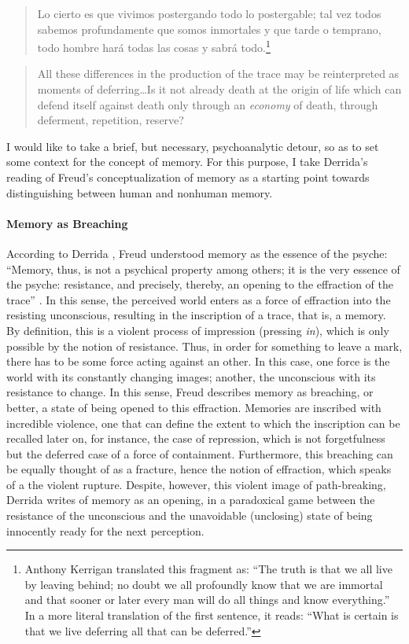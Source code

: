 \begin{quote}
	Lo cierto es que vivimos postergando todo lo postergable; tal vez todos sabemos profundamente que somos inmortales y que tarde o temprano, todo hombre hará todas las cosas y sabrá todo.\footnote{Anthony Kerrigan translated this fragment as: ``The truth is that we all live by leaving behind; no doubt we all profoundly know that we are immortal and that sooner or later every man will do all things and know everything.'' In a more literal translation of the first sentence, it reads: ``What is certain is that we live deferring all that can be deferred.''} \parencite{Bor42:Fun}
\end{quote}
\begin{quote}
	All these differences in the production of the trace may be reinterpreted as moments of deferring\dots Is it not already death at the origin of life which can defend itself against death only through an \textit{economy} of death, through deferment, repetition, reserve? \parencite[202]{Der78:Wri}
\end{quote}

I would like to take a brief, but necessary, psychoanalytic detour, so as to set some context for the concept of memory. For this purpose, I take Derrida's reading of Freud's conceptualization of memory as a starting point towards distinguishing between human and nonhuman memory. 

\paragraph{Memory as Breaching}
According to Derrida \parencite{Der78:Wri}, Freud understood memory as the essence of the psyche: ``Memory, thus, is not a psychical property among others; it is the very essence of the psyche: resistance, and precisely, thereby, an opening to the effraction of the trace'' \parencite[201]{Der78:Wri}. In this sense, the perceived world enters as a force of effraction into the resisting unconscious, resulting in the inscription of a trace, that is, a memory. By definition, this is a violent process of impression (pressing \textit{in}), which is only possible by the notion of resistance. Thus, in order for something to leave a mark, there has to be some force acting against an other. In this case, one force is the world with its constantly changing images; another, the unconscious with its resistance to change. In this sense, Freud describes memory as breaching, or better, a state of being opened to this effraction. Memories are inscribed with incredible violence, one that can define the extent to which the inscription can be recalled later on, for instance, the case of repression, which is not forgetfulness but the deferred case of a force of containment. Furthermore, this breaching can be equally thought of as a fracture, hence the notion of effraction, which speaks of a the violent rupture. Despite, however, this violent image of path-breaking, Derrida writes of memory as an opening, in a paradoxical game between the resistance of the unconscious and the unavoidable (unclosing) state of being innocently ready for the next perception. 

